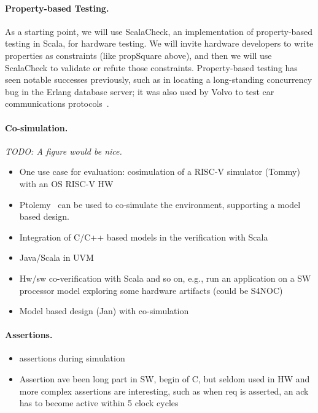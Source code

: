 \documentclass[fleqn,12pt]{article}
\newcommand{\todo}[1]{{\it TODO: #1}}
\begin{document}
\paragraph{Property-based Testing.}
As a starting point, we will use ScalaCheck, an implementation of
property-based testing in Scala, for hardware testing. We will invite
hardware developers to write properties as constraints (like
propSquare above), and then we will use ScalaCheck to validate or
refute those constraints. Property-based testing has seen notable
successes previously, such as in locating a long-standing concurrency bug
in the Erlang database server; it was also used by Volvo to test car
communications protocols~\cite{DBLP:conf/icse/HughesNSA16}.


\paragraph{Co-simulation.}

\todo{A figure would be nice.}

\begin{itemize}
\item One use case for evaluation: cosimulation of a RISC-V simulator (Tommy) with an OS RISC-V HW 
\item Ptolemy~\cite{ptolemyII-book} can be used to co-simulate the environment, supporting a model based design.
\item Integration of C/C++ based models in the verification with Scala
\item Java/Scala in UVM
\item Hw/sw co-verification with Scala and so on, e.g., run an application on a SW processor model exploring some hardware artifacts (could be S4NOC)
\item Model based design (Jan) with co-simulation
\end{itemize}

\paragraph{Assertions.}

\begin{itemize}
\item assertions during simulation
\item Assertion ave been long part in SW, begin of C, but seldom used in HW and more complex assertions are interesting, such as when req is asserted, an ack has to become active within 5 clock cycles
\end{itemize}
\end{document}

